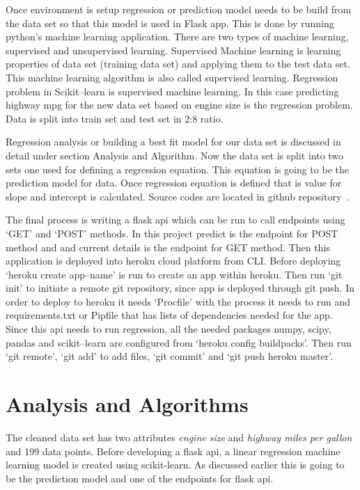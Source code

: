  Once environment is setup regression or prediction model needs to be build
 from the data set so that this model is used in Flask app. This is done by
 running python's machine learning application. There are two types of
 machine learning, supervised and unsupervised learning. Supervised
 Machine learning is learning properties of data set (training data set)
 and applying them to the test data set. This machine learning algorithm
 is also called supervised learning. Regression problem in Scikit--learn
 is supervised machine learning. In this case predicting highway mpg for
 the new data set based on engine size is the regression problem. Data
 is split into train set and test set in 2:8 ratio.
    
 Regression analysis or building a best fit model for our data set is
 discussed in detail under section Analysis and Algorithm. Now the data
 set is split into two sets one used for defining a regression 
 equation. This equation is going to be the prediction model for data.
 Once regression equation is defined
 that is value for slope and intercept is calculated.   
 Source codes are located in github repository~\cite{hid-sp18-415-regression}.
   
The final process is writing a flask api which can be run to call 
endpoints using `GET' and `POST' methods. In this project predict is the
endpoint for POST method and and current details is the endpoint for GET
method. Then this application is deployed into heroku cloud platform from
CLI. Before deploying `heroku create app--name' is run to create an app within
heroku. Then run `git init' to initiate a remote git repository, since app is 
deployed through git push. In order to deploy to heroku it needs `Procfile'
with the process it needs to run and requirements.txt or Pipfile that has lists 
of dependencies needed for the app. Since this api needs to run regression, all
the needed packages numpy, scipy, pandas and scikit--learn are configured from 
`heroku config buildpacks'. Then run `git remote', `git add' to add files,  
`git commit' and `git push heroku master'.
    

\section{Analysis and Algorithms}

 The cleaned data set has two attributes \textit{engine size} and
 \textit{highway miles per gallon} and 199 data points. Before developing
 a flask api, a linear regression machine learning model is created using
 scikit-learn. As discussed earlier this is going to be the prediction model
 and one of the endpoints for flask api.

